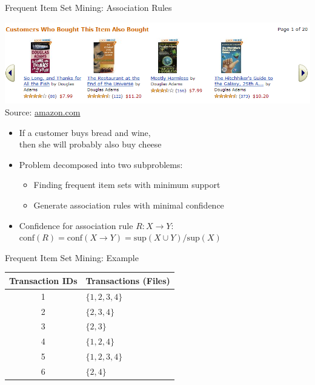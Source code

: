 \note{
}

\begin{frame}{Frequent Item Set Mining: Association Rules}
  \begin{center}
    \includegraphics[width=\textwidth]{figures/frequent-items} \\
    \tiny{Source: \url{amazon.com}}
  \end{center}


  \begin{itemize}
  \item \alert{If} a customer buys \alert{bread} and \alert{wine}, \\
    \alert{then} she will probably also buy \alert{cheese}
  \item Problem decomposed into two subproblems:
    \begin{itemize}
    \item Finding frequent item sets with minimum support
    \item Generate association rules with minimal confidence
    \end{itemize}
  \item Confidence for association rule $R: X \rightarrow Y$:
    $\text{conf}(R) = \text{conf}(X \rightarrow Y) =
    \text{sup}(X \cup Y)/\text{sup}(X)$
  \end{itemize}
\end{frame}

\note{
}

\begin{frame}{Frequent Item Set Mining: Example}
  \begin{center}
    \begin{tabular}{c|l}
      Transaction IDs & Transactions (Files) \\ \hline \hline
      1 & $\{1, 2, 3, 4\}$ \\ \hline
      2 & $\{2, 3, 4\}$ \\ \hline
      3 & $\{2, 3\}$ \\ \hline
      4 & $\{1, 2, 4\}$ \\ \hline
      5 & $\{1, 2, 3, 4\}$ \\ \hline
      6 & $\{2, 4\}$ \\
    \end{tabular}
  \end{center}
\end{frame}

